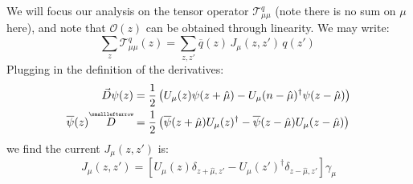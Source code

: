 \documentclass[11pt, oneside]{article}   	%
\theoremstyle{definition}
\newcommand{\cev}[1]{\overset{\scriptscriptstyle\smallleftarrow}{#1}}
\begin{document}
We will focus our analysis on the tensor operator 
$\mathcal T^q_{\mu\mu}$ (note there is no sum on $\mu$ here), and note that $\mathcal O(z)$ can be obtained through 
linearity. We may write:
\begin{equation}
	\sum_z\mathcal T^q_{\mu\mu}(z) = \sum_{z, z'}\overline q(z)\, J_\mu(z, z')\,q(z')~
	\label{eq:operator_mom_proj}
\end{equation}
Plugging in the definition of the derivatives:
\begin{align}
	\vec D\psi(z) &= \frac{1}{2}\left(U_\mu(z)\psi(z + \hat\mu) - U_\mu(n - \hat\mu)^\dagger \psi(z - \hat\mu)\right) \\
	\overline\psi(z) \cev D &= \frac{1}{2}\left(\overline\psi(z + \hat\mu)U_\mu(z)^\dagger - 
	\overline\psi(z - \hat\mu) U_\mu(z - \hat\mu)\right)
\end{align}
we find the current $J_\mu(z, z')$ is:
\begin{equation}
	J_\mu(z, z') = \left[U_\mu(z) \delta_{z + \hat\mu, z'} - U_\mu(z')^\dagger\delta_{z - \hat\mu, z'}\right]\gamma_\mu
\end{equation}
\end{document}

